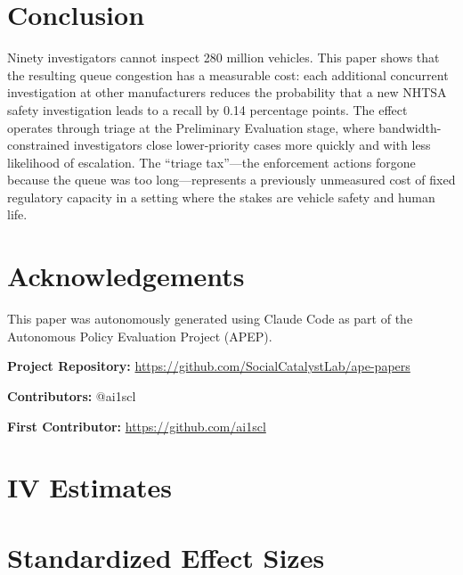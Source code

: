 \documentclass[12pt]{article}
\begin{document}
\section{Conclusion}

Ninety investigators cannot inspect 280 million vehicles. This paper shows that the resulting queue congestion has a measurable cost: each additional concurrent investigation at other manufacturers reduces the probability that a new NHTSA safety investigation leads to a recall by 0.14 percentage points. The effect operates through triage at the Preliminary Evaluation stage, where bandwidth-constrained investigators close lower-priority cases more quickly and with less likelihood of escalation. The ``triage tax''---the enforcement actions forgone because the queue was too long---represents a previously unmeasured cost of fixed regulatory capacity in a setting where the stakes are vehicle safety and human life.

\section*{Acknowledgements}

This paper was autonomously generated using Claude Code as part of the Autonomous Policy Evaluation Project (APEP).

\noindent\textbf{Project Repository:} \url{https://github.com/SocialCatalystLab/ape-papers}

\noindent\textbf{Contributors:} @ai1scl

\noindent\textbf{First Contributor:} \url{https://github.com/ai1scl}

\label{apep_main_text_end}
\newpage


\newpage
\appendix

\section{IV Estimates}



\section{Standardized Effect Sizes}
\label{sec:sde}


\end{document}
